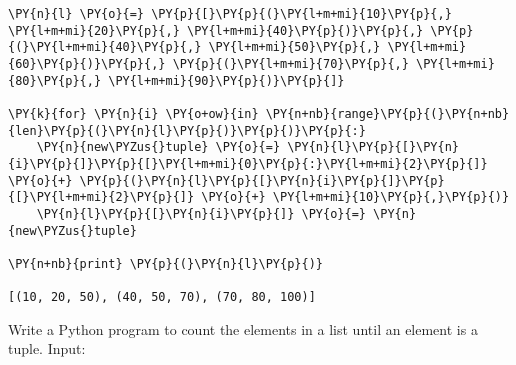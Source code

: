 \begin{Answer}
\begin{tcolorbox}[size=fbox, boxrule=1pt, colback=cellbackground, colframe=cellborder]
\begin{Verbatim}[commandchars=\\\{\}]
\PY{n}{l} \PY{o}{=} \PY{p}{[}\PY{p}{(}\PY{l+m+mi}{10}\PY{p}{,} \PY{l+m+mi}{20}\PY{p}{,} \PY{l+m+mi}{40}\PY{p}{)}\PY{p}{,} \PY{p}{(}\PY{l+m+mi}{40}\PY{p}{,} \PY{l+m+mi}{50}\PY{p}{,} \PY{l+m+mi}{60}\PY{p}{)}\PY{p}{,} \PY{p}{(}\PY{l+m+mi}{70}\PY{p}{,} \PY{l+m+mi}{80}\PY{p}{,} \PY{l+m+mi}{90}\PY{p}{)}\PY{p}{]}

\PY{k}{for} \PY{n}{i} \PY{o+ow}{in} \PY{n+nb}{range}\PY{p}{(}\PY{n+nb}{len}\PY{p}{(}\PY{n}{l}\PY{p}{)}\PY{p}{)}\PY{p}{:}
    \PY{n}{new\PYZus{}tuple} \PY{o}{=} \PY{n}{l}\PY{p}{[}\PY{n}{i}\PY{p}{]}\PY{p}{[}\PY{l+m+mi}{0}\PY{p}{:}\PY{l+m+mi}{2}\PY{p}{]} \PY{o}{+} \PY{p}{(}\PY{n}{l}\PY{p}{[}\PY{n}{i}\PY{p}{]}\PY{p}{[}\PY{l+m+mi}{2}\PY{p}{]} \PY{o}{+} \PY{l+m+mi}{10}\PY{p}{,}\PY{p}{)}
    \PY{n}{l}\PY{p}{[}\PY{n}{i}\PY{p}{]} \PY{o}{=} \PY{n}{new\PYZus{}tuple}
    
\PY{n+nb}{print} \PY{p}{(}\PY{n}{l}\PY{p}{)}

[(10, 20, 50), (40, 50, 70), (70, 80, 100)]
\end{Verbatim}
\end{tcolorbox} 
\end{Answer}

\begin{Exercise}
Write a Python program to count the elements in a list until an element is a tuple.
Input:
\begin{Shaded}
\begin{Highlighting}[]
\NormalTok{\{[}\NormalTok{, }\NormalTok{, (}\NormalTok{,}\NormalTok{:}\NormalTok{\}]\}}
\end{Highlighting}
\end{Shaded}
\end{Exercise}

